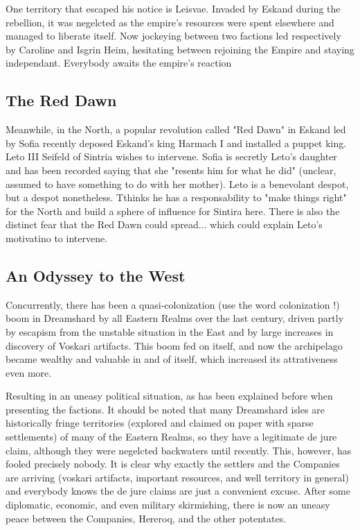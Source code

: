 One territory that escaped his notice is Leisvae. Invaded by Eskand during the rebellion, it was negelcted as the empire's resources were spent elsewhere and managed to liberate itself. Now jockeying between two factions led respectively by Caroline and Isgrin Heim, hesitating between rejoining the Empire and staying independant. Everybody awaits the empire's reaction

\subsection{The Red Dawn}

Meanwhile, in the North, a popular revolution called "Red Dawn" in Eskand led by Sofia recently deposed Eskand's king Harmach I and installed a puppet king. Leto III Seifeld of Sintria wishes to intervene. Sofia is secretly Leto's daughter and has been recorded saying that she "resents him for what he did" (unclear, assumed to have something to do with her mother). Leto is a benevolant despot, but a despot nonetheless. Tthinks he has a responsability to "make things right" for the North and build a sphere of influence for Sintira here. There is also the distinct fear that the Red Dawn could spread... which could explain Leto's motivatino to intervene.

\subsection{An Odyssey to the West}
 
Concurrently, there has been a quasi-colonization (use the word colonization !) boom in Dreamshard by all Eastern Realms over the last century, driven partly by escapism from the unstable situation in the East and by large increases in discovery of Voskari artifacts. This boom fed on itself, and now the archipelago became wealthy and valuable in and of itself, which increased its attrativeness even more.

Resulting in an uneasy political situation, as has been explained before when presenting the factions. It should be noted that many Dreamshard isles are historically fringe territories (explored and claimed on paper with sparse settlements) of many of the Eastern Realms, so they have a legitimate de jure claim, although they were negelcted backwaters until recently. This, however, has fooled precisely nobody. It is clear why exactly the settlers and the Companies are arriving (voskari artifacts, important resources, and well territory in general) and everybody knows the de jure claims are just a convenient excuse. After some diplomatic, economic, and even military skirmishing, there is now an uneasy peace between the Companies, Hereroq, and the other potentates.

